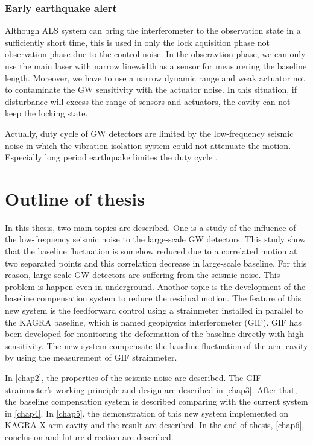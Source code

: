 \subsubsection{Early earthquake alert}
Although ALS system can bring the interferometer to the observation state in a sufficiently short time, this is used in only the lock aquisition phase not observation phase due to the control noise. In the obseravtion phase, we can only use the main laser with narrow linewidth as a sensor for measurering the baseline length. Moreover, we have to use a narrow dynamic range and weak actuator not to contaminate the GW sensitivity with the actuator noise. In this situation, if disturbance will excess the range of sensors and actuators, the cavity can not keep the locking state. 

Actually, duty cycle of GW detectors are limited by the low-frequency seismic noise in which the vibration isolation system could not attenuate the motion. Especially long period earthquake limites the duty cycle \cite{Biscans2018control}. 

\section{Outline of thesis} \label{sec:15}
In this thesis, two main topics are described. One is a study of the influence of the low-frequency seismic noise to the large-scale GW detectors. This study show that the baseline fluctuation is somehow reduced due to a correlated motion at two separated points and this correlation decrease in large-scale baseline. For this reason, large-scale GW detectors are suffering from the seismic noise. This problem is happen even in underground. Anothor topic is the development of the baseline compensation system to reduce the residual motion. The feature of this new system is the feedforward control using a strainmeter installed in parallel to the KAGRA baseline, which is named geophysics interferometer (GIF). GIF has been developed for monitoring the deformation of the baseline directly with high sensitivity. The new system compensate the baseline fluctuation of the arm cavity by using the measurement of GIF strainmeter.

In \cref{chap2}, the properties of the seismic noise are described. The GIF strainmeter's working principle and design are described in \cref{chap3}. After that, the baseline compensation system is described comparing with the current system in \cref{chap4}. In \cref{chap5}, the demonstration of this new system implemented on KAGRA X-arm cavity and the result are described. In the end of thesis, \cref{chap6}, conclusion and future direction are described.

